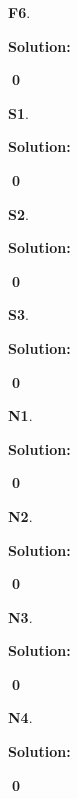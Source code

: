\documentclass{article}
\newenvironment{problem}[1]
{
  \begin{flushleft}
  \textbf{#1}.
  \ignorespaces
}
{
  \end{flushleft}
}
\newenvironment{solution}
{
  \ignorespaces
  \textbf{Solution:}
}
{
  \ignorespacesafterend
  \begin{flushright}
  {\bfseries \qed}
  \end{flushright}
}
\begin{document}
\begin{problem}{F6}

\end{problem}
\begin{solution}

\end{solution}


\begin{problem}{S1}

\end{problem}
\begin{solution}

\end{solution}

\begin{problem}{S2}

\end{problem}
\begin{solution}

\end{solution}

\begin{problem}{S3}

\end{problem}
\begin{solution}

\end{solution}


\begin{problem}{N1}

\end{problem}
\begin{solution}

\end{solution}

\begin{problem}{N2}

\end{problem}
\begin{solution}

\end{solution}

\begin{problem}{N3}

\end{problem}
\begin{solution}

\end{solution}

\begin{problem}{N4}

\end{problem}
\begin{solution}

\end{solution}
\end{document}
